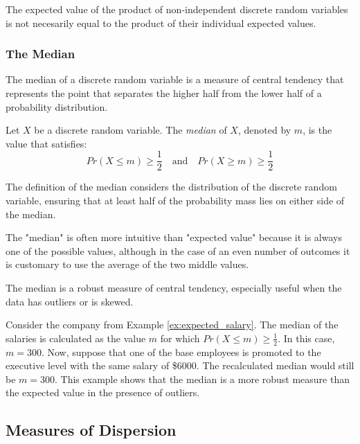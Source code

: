 The expected value of the product of non-independent discrete random variables is not necesarily equal to the product of their individual expected values.


\subsubsection*{The Median}

The median of a discrete random variable is a measure of central tendency that represents the point that separates the higher half from the lower half of a probability distribution.

\begin{definition}
Let $X$ be a discrete random variable. The \emph{median} of $X$, denoted by $m$, is the value that satisfies:
\[
Pr\left(X\leq m\right)\geq \frac{1}{2} \quad \text{and} \quad Pr\left(X\geq m\right)\geq \frac{1}{2}
\]
\end{definition}

The definition of the median considers the distribution of the discrete random variable, ensuring that at least half of the probability mass lies on either side of the median.

The "median" is often more intuitive than "expected value" because it is always one of the possible values, although in the case of an even number of outcomes it is customary to use the average of the two middle values.

The median is a robust measure of central tendency, especially useful when the data has outliers or is skewed.

\begin{example}
Consider the company from Example \ref{ex:expected_salary}. The median of the salaries is calculated as the value $m$ for which $Pr\left(X\leq m\right)\geq \frac{1}{2}$. In this case, $m=300$. Now, suppose that one of the base employees is promoted to the executive level with the same salary of \$6000. The recalculated median would still be $m=300$. This example shows that the median is a more robust measure than the expected value in the presence of outliers.
\end{example}

%
%

\subsection{Measures of Dispersion}

